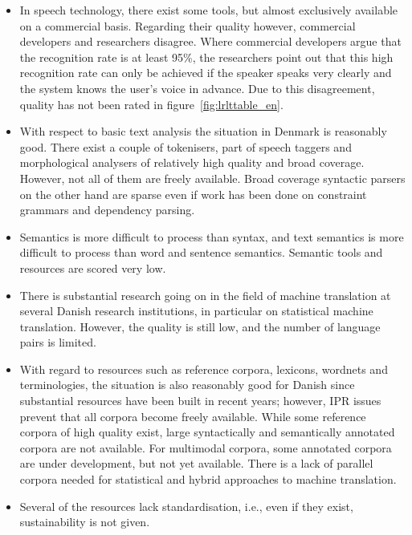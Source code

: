 \begin{multicols}{2}
\begin{itemize}
\item In speech technology, there exist some tools, but almost exclusively available on a commercial basis. Regarding their quality however, commercial developers and researchers disagree. Where commercial developers argue that the recognition rate is at least 95\%, the researchers point out that this high recognition rate can only be achieved if the speaker speaks very clearly and the system knows the user's voice in advance. Due to this disagreement, quality has not been rated in figure~\ref{fig:lrlttable_en}.
\item With respect to basic text analysis the situation in Denmark is reasonably good. There exist a couple of tokenisers, part of speech taggers and morphological analysers of relatively high quality and broad coverage.  However, not all of them are freely available. Broad coverage syntactic parsers on the other hand are sparse even if work has been done on constraint grammars and dependency parsing.
\item Semantics is more difficult to process than syntax, and text semantics is more difficult to process than word and sentence semantics. Semantic tools and resources are scored very low. 
\item There is substantial research going on in the field of machine translation at several Danish research institutions, in particular on statistical machine translation. However, the quality is still low, and the number of language pairs is limited.
\item With regard to resources such as reference corpora, lexicons, wordnets and terminologies, the situation is also reasonably good for Danish since substantial resources have been built in recent years; however, IPR issues prevent that all corpora become freely available. While some reference corpora of high quality exist, large syntactically and semantically annotated corpora are not available. For multimodal corpora, some annotated corpora are under development, but not yet available. There is a lack of parallel corpora needed for statistical and hybrid approaches to machine translation.
\item Several of the resources lack standardisation, i.e., even if they exist, sustainability is not given.
\end{itemize}


\end{multicols}
